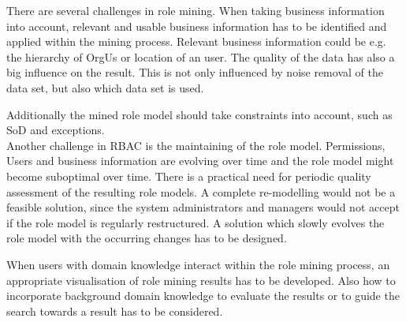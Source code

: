 There are several challenges in role mining. When taking business information into account, relevant and usable business information has to be identified and applied within the mining process. Relevant business information could be e.g. the hierarchy of \glspl{OrgU} or location of an user. The quality of the data has also a big influence on the result. This is not only influenced by noise removal of the data set, but also which data set is used.
\iffalse
In order to meet the least privileged access principle, a data set, which describes the actual user activity and usage of permissions is preferable. These information can come from system logs, which truly records the permission-usage and permission-update information. \cite{Molloy}\\
\fi

Additionally the mined role model should take constraints into account, such as \gls{SoD} and exceptions. \cite{Lu}\\

Another challenge in \gls{RBAC} is the maintaining of the role model. Permissions, Users and business information are evolving over time and the role model might become suboptimal over time. There is a practical need for periodic quality assessment of the resulting role models. \cite{Kunz} A complete re-modelling would not be a feasible solution, since the system administrators and managers would not accept if the role model is regularly restructured. A solution which slowly evolves the role model with the occurring changes has to be designed.


When users with domain knowledge interact within the role mining process, an appropriate visualisation of role mining results has to be developed. Also how to incorporate background domain knowledge to evaluate the results or to guide the search towards a result has to be considered. \cite{Han}\\

\iffalse
Currently researchers are looking into using artificial intelligence (AI) techniques to design role mining algorithms. \cite{DuChang}
\fi

\fi
